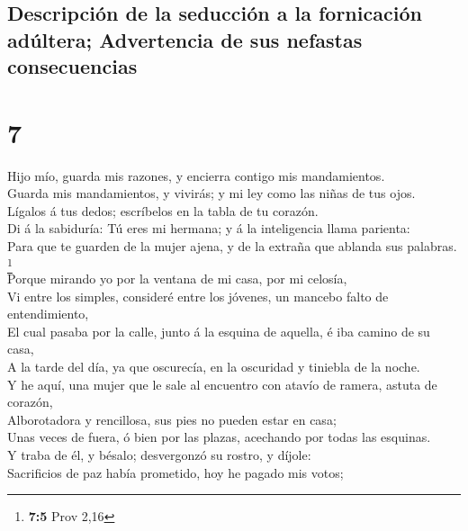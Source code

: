 \hypertarget{descripciuxf3n-de-la-seducciuxf3n-a-la-fornicaciuxf3n-aduxfaltera-advertencia-de-sus-nefastas-consecuencias}{%
\subsection{Descripción de la seducción a la fornicación adúltera;
Advertencia de sus nefastas
consecuencias}\label{descripciuxf3n-de-la-seducciuxf3n-a-la-fornicaciuxf3n-aduxfaltera-advertencia-de-sus-nefastas-consecuencias}}

\hypertarget{section-6}{%
\section{7}\label{section-6}}

 Hijo mío, guarda mis razones, y encierra contigo mis
mandamientos.\\
 Guarda mis mandamientos, y vivirás; y mi ley como las niñas
de tus ojos.\\
 Lígalos á tus dedos; escríbelos en la tabla de tu
corazón.\\
 Di á la sabiduría: Tú eres mi hermana; y á la inteligencia
llama parienta:\\
 Para que te guarden de la mujer ajena, y de la extraña que
ablanda sus palabras. \footnote{\textbf{7:5} Prov 2,16}\\
 Porque mirando yo por la ventana de mi casa, por mi
celosía,\\
 Vi entre los simples, consideré entre los jóvenes, un
mancebo falto de entendimiento,\\
 El cual pasaba por la calle, junto á la esquina de aquella,
é iba camino de su casa,\\
 A la tarde del día, ya que oscurecía, en la oscuridad y
tiniebla de la noche.\\
 Y he aquí, una mujer que le sale al encuentro con atavío
de ramera, astuta de corazón,\\
 Alborotadora y rencillosa, sus pies no pueden estar en
casa;\\
 Unas veces de fuera, ó bien por las plazas, acechando por
todas las esquinas.\\
 Y traba de él, y bésalo; desvergonzó su rostro, y
díjole:\\
 Sacrificios de paz había prometido, hoy he pagado mis
votos;\\
